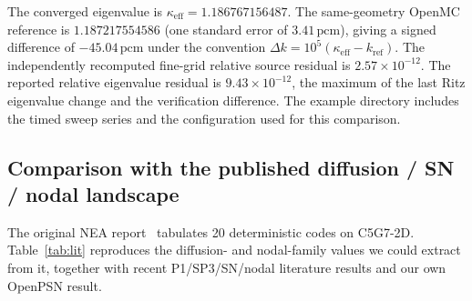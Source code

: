 \documentclass[11pt,a4paper]{article}
\newcommand{\keff}{\kappa_{\mathrm{eff}}}
\newcommand{\pcm}{\,\mathrm{pcm}}
\begin{document}
The converged eigenvalue is $\keff=1.186767156487$.
The same-geometry OpenMC reference is $1.187217554586$
(one standard error of $3.41\pcm$), giving a signed difference of
$-45.04\pcm$ under the convention $\Delta k=10^{5}(\keff-k_\mathrm{ref})$.
The independently recomputed fine-grid relative source residual is
$2.57\times10^{-12}$. The reported relative eigenvalue residual is
$9.43\times10^{-12}$, the maximum of the last Ritz eigenvalue change
and the verification difference. The example directory includes the
timed sweep series and the configuration used for this comparison.



\clearpage
\subsection{Comparison with the published diffusion / SN / nodal landscape}
The original NEA report~\cite{nea2003} tabulates 20 deterministic codes on
C5G7-2D. Table~\ref{tab:lit} reproduces the diffusion- and nodal-family
values we could extract from it, together with recent P1/SP3/SN/nodal
literature results and our own OpenPSN result.
\end{document}
